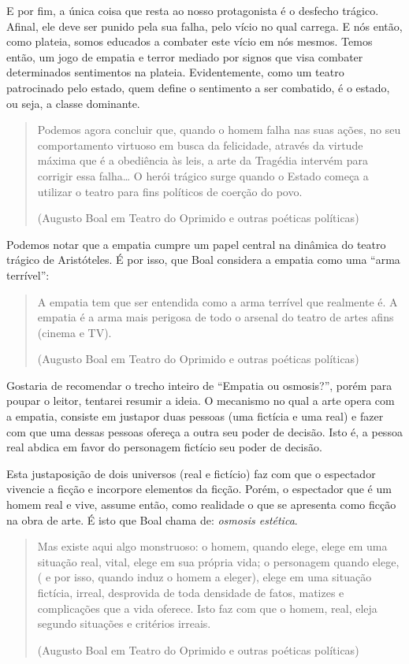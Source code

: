 E por fim, a única coisa que resta ao nosso protagonista é o desfecho trágico. Afinal, ele deve ser punido pela sua falha, pelo vício no qual carrega. E nós então, como plateia, somos educados a combater este vício em nós mesmos. Temos então, um jogo de empatia e terror mediado por signos que visa combater determinados sentimentos na plateia. Evidentemente, como um teatro patrocinado pelo estado, quem define o sentimento a ser combatido, é o estado, ou seja, a classe dominante.

\begin{quote}
Podemos agora concluir que, quando o homem falha nas suas ações, no seu comportamento virtuoso em busca da felicidade, através da virtude máxima que é a obediência às leis, a arte da Tragédia intervém para corrigir essa falha… O herói trágico surge quando o Estado começa a utilizar o teatro para fins políticos de coerção do povo.

(Augusto Boal em Teatro do Oprimido e outras poéticas políticas)
\end{quote}

Podemos notar que a empatia cumpre um papel central na dinâmica do teatro trágico de Aristóteles. É por isso, que Boal considera a empatia como uma “arma terrível”:

\begin{quote}
A empatia tem que ser entendida como a arma terrível que realmente é. A empatia é a arma mais perigosa de todo o arsenal do teatro de artes afins (cinema e TV).

(Augusto Boal em Teatro do Oprimido e outras poéticas políticas)
\end{quote}

Gostaria de recomendar o trecho inteiro de “Empatia ou osmosis?”, porém para poupar o leitor, tentarei resumir a ideia. O mecanismo no qual a arte opera com a empatia, consiste em justapor duas pessoas (uma fictícia e uma real) e fazer com que uma dessas pessoas ofereça a outra seu poder de decisão. Isto é, a pessoa real abdica em favor do personagem fictício seu poder de decisão.

Esta justaposição de dois universos (real e fictício) faz com que o espectador vivencie a ficção e incorpore elementos da ficção. Porém, o espectador que é um homem real e vive, assume então, como realidade o que se apresenta como ficção na obra de arte. É isto que Boal chama de: \textit{osmosis estética}.

\begin{quote}
Mas existe aqui algo monstruoso: o homem, quando ele­ge, elege em uma situação real, vital, elege em sua própria vida; o personagem quando elege, ( e por isso, quando induz o homem a eleger), elege em uma situação fictícia, irreal, des­provida de toda densidade de fatos, matizes e complicações que a vida oferece. Isto faz com que o homem, real, eleja segundo situações e critérios irreais.

(Augusto Boal em Teatro do Oprimido e outras poéticas políticas)
\end{quote}

